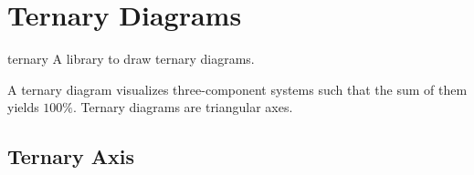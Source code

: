
\section{Ternary Diagrams}
\begingroup
\def\pgfplotsmanualcurlibrary{ternary}

\begin{pgfplotslibrary}{ternary}
    A library to draw ternary diagrams.

    A ternary diagram visualizes three-component systems such that the sum of
    them yields $100\%$. Ternary diagrams are triangular axes.
\end{pgfplotslibrary}


\subsection{Ternary Axis}

